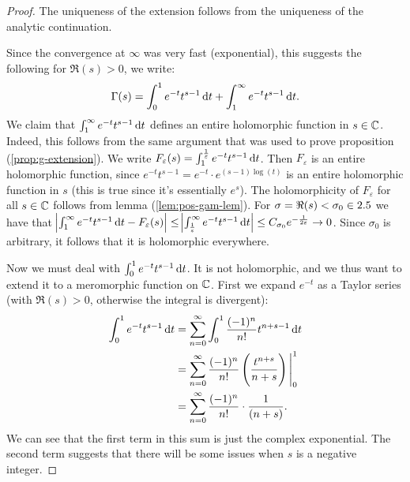 \begin{proof}
The uniqueness of the extension follows from the uniqueness of the analytic continuation.

Since the convergence at $\infty$ was very fast (exponential), this suggests the following for $\Re(s) > 0$, we write:
\begin{align*}
    \Gamma(s) = \int_0^1e^{-t}t^{s-1} \dif t + \int_1^\infty e^{-t}t^{s-1} \dif t.
\end{align*}
We claim that $\int_1^\infty e^{-t}t^{s-1} \dif t$ defines an entire holomorphic function in $s\in \mathbb{C}$. Indeed, this follows from the same argument that was used to prove proposition (\ref{prop:g-extension}). We write $F_\varepsilon (s) = \int_1^{\frac{1}{\varepsilon}} e^{-t}t^{s-1} \dif t$. Then $F_\varepsilon$ is an entire holomorphic function, since $e^{-t}t^{s-1} = e^{-t} \cdot e^{(s-1)\log(t)}$ is an entire holomorphic function in $s$ (this is true since it's essentially $e^s$). The holomorphicity of $F_\varepsilon$ for all $s \in \mathbb{C}$ follows from lemma (\ref{lem:pos-gam-lem}). For $\sigma = \Re(s) < \sigma_0 \in 2.5$ we have that $\abs{ \int_1^\infty e^{-t}t^{s-1} \dif t -    F_\varepsilon (s) } \leq \abs{\int_{\frac{1}{\varepsilon}}^\infty e^{-t}t^{s-1} \dif t} \leq C_{\sigma_0} e^{-\frac{1}{2 \varepsilon}} \to 0$. Since $\sigma_0$ is arbitrary, it follows that it is holomorphic everywhere.

Now we must deal with $\int_0^1e^{-t}t^{s-1} \dif t$. It is not holomorphic, and we thus want to extend it to a meromorphic function on $\mathbb{C}$. First we expand $e^{-t}$ as a Taylor series (with $\Re(s) > 0$, otherwise the integral is divergent):
\begin{align*}
    \int_0^1e^{-t}t^{s-1} \dif t &= \sum_{n=0}^\infty \int_0^1 \frac{(-1)^n}{n!}t^{n+s-1} \dif t\\
    &=\sum_{n=0}^\infty \frac{(-1)^n}{n!} \br{\frac{t^{n+s}}{n+s}} \Bigg|_0^1\\
    &= \sum_{n=0}^\infty \frac{(-1)^n}{n!} \cdot \frac{1}{(n+s)}.
\end{align*}
We can see that the first term in this sum is just the complex exponential. The second term suggests that there will be some issues when $s$ is a negative integer.


\end{proof}
